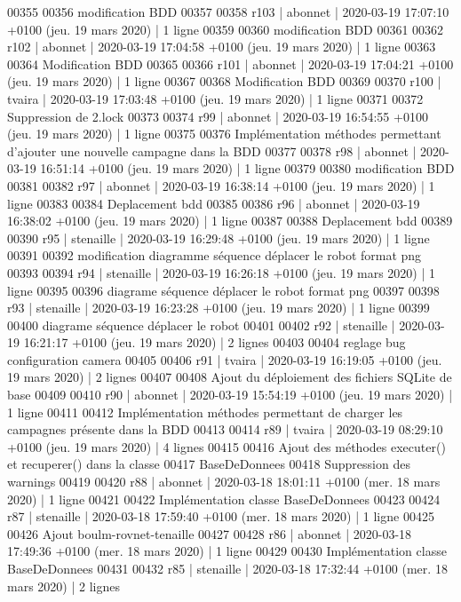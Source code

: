 \begin{DoxyCode}
00355 
00356 modification BDD
00357 
00358 r103 | abonnet | 2020-03-19 17:07:10 +0100 (jeu. 19 mars 2020) | 1 ligne
00359 
00360 modification BDD
00361 
00362 r102 | abonnet | 2020-03-19 17:04:58 +0100 (jeu. 19 mars 2020) | 1 ligne
00363 
00364 Modification BDD
00365 
00366 r101 | abonnet | 2020-03-19 17:04:21 +0100 (jeu. 19 mars 2020) | 1 ligne
00367 
00368 Modification BDD
00369 
00370 r100 | tvaira | 2020-03-19 17:03:48 +0100 (jeu. 19 mars 2020) | 1 ligne
00371 
00372 Suppression de 2.lock
00373 
00374 r99 | abonnet | 2020-03-19 16:54:55 +0100 (jeu. 19 mars 2020) | 1 ligne
00375 
00376 Implémentation méthodes permettant d'ajouter une nouvelle campagne dans la BDD
00377 
00378 r98 | abonnet | 2020-03-19 16:51:14 +0100 (jeu. 19 mars 2020) | 1 ligne
00379 
00380 modification BDD
00381 
00382 r97 | abonnet | 2020-03-19 16:38:14 +0100 (jeu. 19 mars 2020) | 1 ligne
00383 
00384 Deplacement bdd
00385 
00386 r96 | abonnet | 2020-03-19 16:38:02 +0100 (jeu. 19 mars 2020) | 1 ligne
00387 
00388 Deplacement bdd
00389 
00390 r95 | stenaille | 2020-03-19 16:29:48 +0100 (jeu. 19 mars 2020) | 1 ligne
00391 
00392 modification diagramme séquence déplacer le robot format png
00393 
00394 r94 | stenaille | 2020-03-19 16:26:18 +0100 (jeu. 19 mars 2020) | 1 ligne
00395 
00396 diagrame séquence déplacer le robot format png
00397 
00398 r93 | stenaille | 2020-03-19 16:23:28 +0100 (jeu. 19 mars 2020) | 1 ligne
00399 
00400 diagrame séquence déplacer le robot
00401 
00402 r92 | stenaille | 2020-03-19 16:21:17 +0100 (jeu. 19 mars 2020) | 2 lignes
00403 
00404 reglage bug configuration camera
00405 
00406 r91 | tvaira | 2020-03-19 16:19:05 +0100 (jeu. 19 mars 2020) | 2 lignes
00407 
00408 Ajout du déploiement des fichiers SQLite de base
00409 
00410 r90 | abonnet | 2020-03-19 15:54:19 +0100 (jeu. 19 mars 2020) | 1 ligne
00411 
00412 Implémentation méthodes permettant de charger les campagnes présente dans la BDD
00413 
00414 r89 | tvaira | 2020-03-19 08:29:10 +0100 (jeu. 19 mars 2020) | 4 lignes
00415 
00416 Ajout des méthodes executer() et recuperer() dans la classe
00417 BaseDeDonnees
00418 Suppression des warnings
00419 
00420 r88 | abonnet | 2020-03-18 18:01:11 +0100 (mer. 18 mars 2020) | 1 ligne
00421 
00422 Implémentation classe BaseDeDonnees
00423 
00424 r87 | stenaille | 2020-03-18 17:59:40 +0100 (mer. 18 mars 2020) | 1 ligne
00425 
00426 Ajout boulm-rovnet-tenaille
00427 
00428 r86 | abonnet | 2020-03-18 17:49:36 +0100 (mer. 18 mars 2020) | 1 ligne
00429 
00430 Implémentation classe BaseDeDonnees
00431 
00432 r85 | stenaille | 2020-03-18 17:32:44 +0100 (mer. 18 mars 2020) | 2 lignes

\end{DoxyCode}
